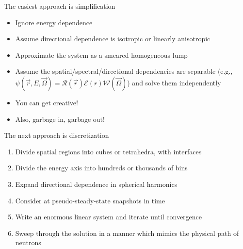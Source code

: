 \documentclass{beamer}
\begin{document}
        \begin{frame}{The easiest approach is simplification}
            \begin{itemize}
                \item Ignore energy dependence
                \pause
                \item Assume directional dependence is isotropic or linearly anisotropic
                \pause
                \item Approximate the system as a smeared homogeneous lump
                \pause
                \item Assume the spatial/spectral/directional dependencies are separable
                      (e.g., $\psi(\vec r, E, \vec\Omega) = \mathcal{R}(\vec r)\mathcal{E}(r)\mathcal{W}(\vec\Omega)$)
                      and solve them independently
                \pause

                \vspace{2em}

                \item You can get creative!
                \pause
                \item Also, garbage in, garbage out!
            \end{itemize}
        \end{frame}

        \begin{frame}{The next approach is discretization}
            \begin{enumerate}
                \item Divide spatial regions into cubes or tetrahedra, with interfaces
                \pause
                \item Divide the energy axis into hundreds or thousands of bins
                \pause
                \item Expand directional dependence in spherical harmonics
                \pause
                \item Consider at pseudo-steady-state snapshots in time
                \pause
                \item Write an enormous linear system and iterate until convergence
                \pause
                \item Sweep through the solution in a manner which mimics the physical path of neutrons
            \end{enumerate}
        \end{frame}
\end{document}
